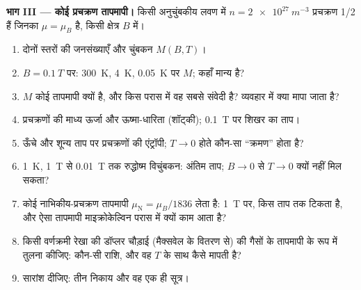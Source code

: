 \begin{problem}
\textbf{भाग III --- कोई प्रचक्रण तापमापी।}
किसी अनुचुंबकीय लवण में $n = \qty{2e27}{m^{-3}}$ प्रचक्रण 1/2 हैं जिनका $\mu
= \mu_B$ है, किसी क्षेत्र $B$ में।
\begin{enumerate}[resume]
  \item दोनों स्तरों की जनसंख्याएँ और चुंबकन
        $M(B,T)$।
  \item $B = \qty{0.1}{T}$ पर: \qty{300}{K}, \qty{4}{K}, \qty{0.05}{K} पर $M$;
         कहाँ मान्य है?
  \item $M$ कोई तापमापी क्यों है, और किस परास में वह सबसे
        संवेदी है? व्यवहार में क्या मापा जाता है?
  \item प्रचक्रणों की माध्य ऊर्जा और ऊष्मा-धारिता (शॉट्की);
        \qty{0.1}{T} पर शिखर का ताप।
  \item ऊँचे और शून्य ताप पर प्रचक्रणों की एंट्रॉपी; $T \to 0$ होते
        कौन-सा ``क्रमण'' होता है?
  \item \qty{1}{K}, \qty{1}{T} से \qty{0.01}{T} तक रुद्धोष्म विचुंबकन:
        अंतिम ताप; $B \to 0$ से $T \to 0$ क्यों नहीं मिल सकता?
  \item कोई नाभिकीय-प्रचक्रण तापमापी $\mu_{\text{N}} = \mu_B/1836$ लेता है:
        \qty{1}{T} पर, किस ताप तक  टिकता है, और
        ऐसा तापमापी माइक्रोकेल्विन परास में क्यों काम आता है?
  \item किसी वर्णक्रमी रेखा की डॉप्लर चौड़ाई (मैक्सवेल के
        वितरण से) की गैसों के तापमापी के रूप में तुलना कीजिए: कौन-सी राशि, और
        वह $T$ के साथ कैसे मापती है?
  \item सारांश दीजिए: तीन निकाय और वह एक ही सूत्र।
\end{enumerate}
\end{problem}
